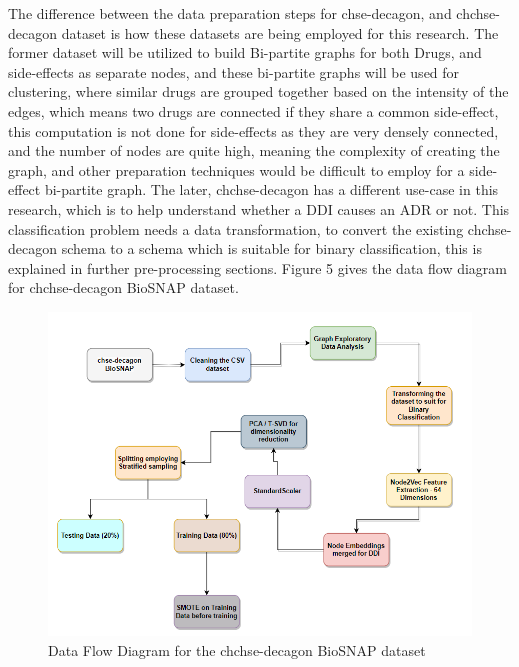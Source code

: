 \documentclass[journal,transmag]{J-NaNA}
\begin{document}
The difference between the data preparation steps for chse-decagon, and chchse-decagon dataset is how these datasets are being employed for this research. The former dataset will be utilized to build Bi-partite graphs for both Drugs, and side-effects as separate nodes, and these bi-partite graphs will be used for clustering, where similar drugs are grouped together based on the intensity of the edges, which means two drugs are connected if they share a common side-effect, this computation is not done for side-effects as they are very densely connected, and the number of nodes are quite high, meaning the complexity of creating the graph, and other preparation techniques would be difficult to employ for a side-effect bi-partite graph. The later, chchse-decagon has a different use-case in this research, which is to help understand whether a DDI causes an ADR or not. This classification problem needs a data transformation, to convert the existing chchse-decagon schema to a schema which is suitable for binary classification, this is explained in further pre-processing sections. Figure 5 gives the data flow diagram for chchse-decagon BioSNAP dataset. 

\begin{figure}[htbp]
\centering
\includegraphics[width=\linewidth]{dataflow_chchse.PNG} 
\caption{Data Flow Diagram for the chchse-decagon BioSNAP dataset}
\label{fig: chchse-decagon data flow diagram} %
\end{figure}
\end{document}
